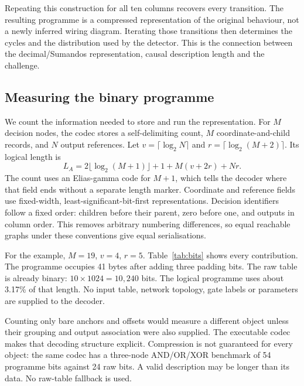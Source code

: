 \documentclass[11pt,a4paper]{article}
\begin{document}
Repeating this construction for all ten columns recovers every transition.
The resulting programme is a compressed representation of the original
behaviour, not a newly inferred wiring diagram. Iterating those transitions
then determines the cycles and the distribution used by the detector.
This is the connection between the decimal/Sumandos representation,
causal description length and the challenge.

\subsection{Measuring the binary programme}
We count the information needed to store and run the representation.
For $M$ decision nodes, the codec stores a self-delimiting count,
$M$ coordinate-and-child records, and $N$ output references. Let
$v=\lceil\log_2 N\rceil$ and $r=\lceil\log_2(M+2)\rceil$. Its logical
length is
\begin{equation}\label{eq:length}
 L_A=2\lfloor\log_2(M+1)\rfloor+1+M(v+2r)+Nr.
\end{equation}
The count uses an Elias-gamma code for $M+1$, which tells the decoder
where that field ends without a separate length marker. Coordinate and reference
fields use fixed-width, least-significant-bit-first representations.
Decision identifiers follow a fixed order: children before their parent,
zero before one, and outputs in column order. This removes arbitrary
numbering differences, so equal reachable graphs under these conventions
give equal serialisations.

For the example, $M=19$, $v=4$, $r=5$. Table~\ref{tab:bits} shows every
contribution. The programme occupies 41 bytes after adding three padding
bits. The raw table is already binary: $10\times1024=10,240$ bits. The
logical programme uses about 3.17\% of that length. No input table, network
topology, gate labels or parameters are supplied to the decoder.

\begin{table}[htbp]\centering

\caption{What exactly is counted? The 325 logical bits contain enough
structure to interpret the decisions and recover all ten outputs.
The three padding bits only fill the last byte. The fixed interpreter
overhead in equation~\eqref{eq:kolmogorov} remains unmeasured.}
\label{tab:bits}
\end{table}

Counting only bare anchors and offsets would measure a different object
unless their grouping and output association were also supplied. The
executable codec makes that decoding structure explicit. Compression is
not guaranteed for every object: the same codec has a three-node
AND/OR/XOR benchmark of 54 programme bits against 24 raw bits. A valid
description may be longer than its data. No raw-table fallback is used.
\end{document}
